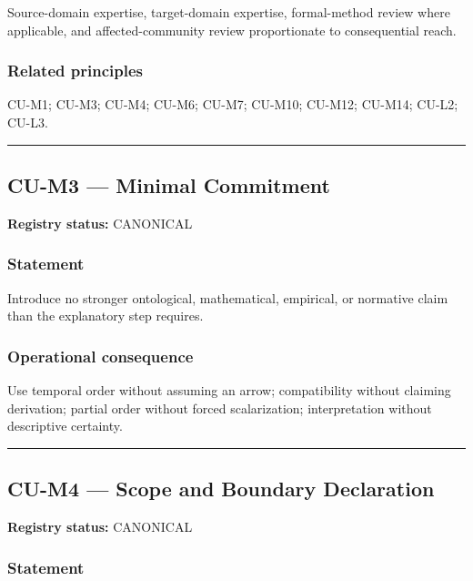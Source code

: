 \documentclass[
  11pt,
]{article}
\begin{document}
Source-domain expertise, target-domain expertise, formal-method review
where applicable, and affected-community review proportionate to
consequential reach.

\subsubsection{Related principles}\label{related-principles-1}

CU-M1; CU-M3; CU-M4; CU-M6; CU-M7; CU-M10; CU-M12; CU-M14; CU-L2; CU-L3.

\begin{center}\rule{0.5\linewidth}{0.5pt}\end{center}

\subsection{CU-M3 --- Minimal
Commitment}\label{cu-m3-minimal-commitment}

\textbf{Registry status:} CANONICAL

\subsubsection{Statement}\label{statement-11}

Introduce no stronger ontological, mathematical, empirical, or normative
claim than the explanatory step requires.

\subsubsection{Operational
consequence}\label{operational-consequence-11}

Use temporal order without assuming an arrow; compatibility without
claiming derivation; partial order without forced scalarization;
interpretation without descriptive certainty.

\begin{center}\rule{0.5\linewidth}{0.5pt}\end{center}

\subsection{CU-M4 --- Scope and Boundary
Declaration}\label{cu-m4-scope-and-boundary-declaration}

\textbf{Registry status:} CANONICAL

\subsubsection{Statement}\label{statement-12}
\end{document}
